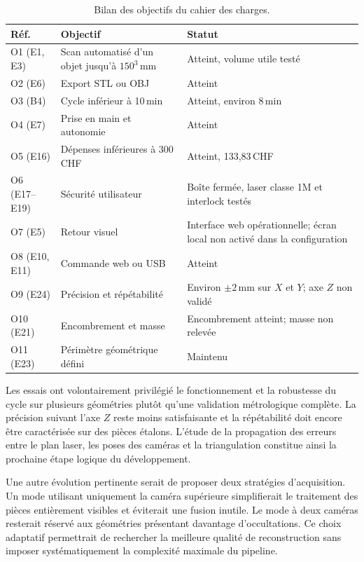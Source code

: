 \begin{table}[H]
  \centering
  \small
  \begin{tabular}{@{}p{2.1cm}p{7.1cm}p{5.2cm}@{}}
    \toprule
    \textbf{Réf.} & \textbf{Objectif} & \textbf{Statut} \\
    \midrule
    O1 (E1, E3) & Scan automatisé d'un objet jusqu'à $150^3$\,mm & Atteint, volume utile testé \\
    O2 (E6) & Export STL ou OBJ & Atteint \\
    O3 (B4) & Cycle inférieur à 10\,min & Atteint, environ 8\,min \\
    O4 (E7) & Prise en main et autonomie & Atteint \\
    O5 (E16) & Dépenses inférieures à 300\,CHF & Atteint, 133,83\,CHF \\
    O6 (E17--E19) & Sécurité utilisateur & Boîte fermée, laser classe 1M et interlock testés \\
    O7 (E5) & Retour visuel & Interface web opérationnelle; écran local non activé dans la configuration \\
    O8 (E10, E11) & Commande web ou USB & Atteint \\
    O9 (E24) & Précision et répétabilité & Environ $\pm 2$\,mm sur $X$ et $Y$; axe $Z$ non validé \\
    O10 (E21) & Encombrement et masse & Encombrement atteint; masse non relevée \\
    O11 (E23) & Périmètre géométrique défini & Maintenu \\
    \bottomrule
  \end{tabular}
  \caption{Bilan des objectifs du cahier des charges.}
  \label{tab:revue-obj}
\end{table}

Les essais ont volontairement privilégié le fonctionnement et la robustesse du
cycle sur plusieurs géométries plutôt qu'une validation métrologique complète.
La précision suivant l'axe $Z$ reste moins satisfaisante et la répétabilité
doit encore être caractérisée sur des pièces étalons. L'étude de la propagation
des erreurs entre le plan laser, les poses des caméras et la triangulation
constitue ainsi la prochaine étape logique du développement.

Une autre évolution pertinente serait de proposer deux stratégies
d'acquisition. Un mode utilisant uniquement la caméra supérieure simplifierait
le traitement des pièces entièrement visibles et éviterait une fusion inutile.
Le mode à deux caméras resterait réservé aux géométries présentant davantage
d'occultations. Ce choix adaptatif permettrait de rechercher la meilleure
qualité de reconstruction sans imposer systématiquement la complexité maximale
du pipeline.

